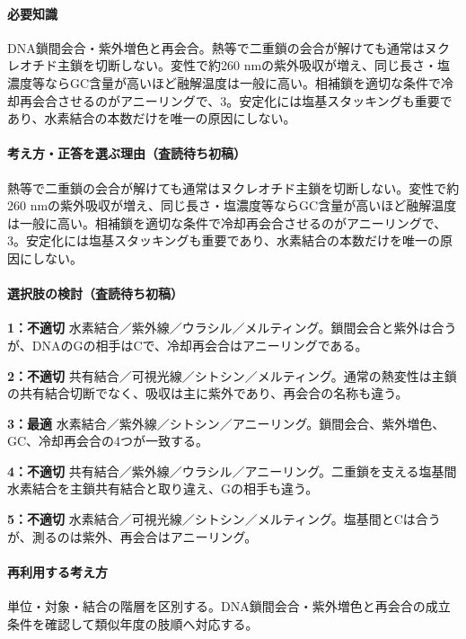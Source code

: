\paragraph{必要知識} DNA鎖間会合・紫外増色と再会合。熱等で二重鎖の会合が解けても通常はヌクレオチド主鎖を切断しない。変性で約260 nmの紫外吸収が増え、同じ長さ・塩濃度等ならGC含量が高いほど融解温度は一般に高い。相補鎖を適切な条件で冷却再会合させるのがアニーリングで、3。安定化には塩基スタッキングも重要であり、水素結合の本数だけを唯一の原因にしない。

\paragraph{考え方・正答を選ぶ理由（査読待ち初稿）} 熱等で二重鎖の会合が解けても通常はヌクレオチド主鎖を切断しない。変性で約260 nmの紫外吸収が増え、同じ長さ・塩濃度等ならGC含量が高いほど融解温度は一般に高い。相補鎖を適切な条件で冷却再会合させるのがアニーリングで、3。安定化には塩基スタッキングも重要であり、水素結合の本数だけを唯一の原因にしない。

\paragraph{選択肢の検討（査読待ち初稿）}\mbox{}\par

\noindent\textbf{1：不適切} 水素結合／紫外線／ウラシル／メルティング。鎖間会合と紫外は合うが、DNAのGの相手はCで、冷却再会合はアニーリングである。\par

\noindent\textbf{2：不適切} 共有結合／可視光線／シトシン／メルティング。通常の熱変性は主鎖の共有結合切断でなく、吸収は主に紫外であり、再会合の名称も違う。\par

\noindent\textbf{3：最適} 水素結合／紫外線／シトシン／アニーリング。鎖間会合、紫外増色、GC、冷却再会合の4つが一致する。\par

\noindent\textbf{4：不適切} 共有結合／紫外線／ウラシル／アニーリング。二重鎖を支える塩基間水素結合を主鎖共有結合と取り違え、Gの相手も違う。\par

\noindent\textbf{5：不適切} 水素結合／可視光線／シトシン／メルティング。塩基間とCは合うが、測るのは紫外、再会合はアニーリング。\par

\paragraph{再利用する考え方} 単位・対象・結合の階層を区別する。DNA鎖間会合・紫外増色と再会合の成立条件を確認して類似年度の肢順へ対応する。

